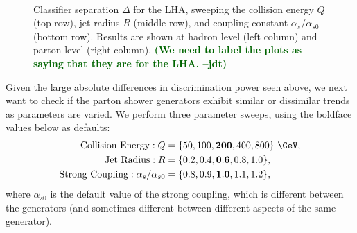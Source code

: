 \documentclass[11pt]{cernrep}
\newcommand{\jdt}[1]{\textbf{\textcolor{darkgreen}{(#1 --jdt)}}}
\begin{document}
\begin{figure}
$\qquad$
\caption{Classifier separation $\Delta$ for the LHA, sweeping the collision energy $Q$ (top row), jet radius $R$ (middle row), and coupling constant $\alpha_s/\alpha_{s0}$ (bottom row).  Results are shown at hadron level (left column) and parton level (right column).  \jdt{We need to label the plots as saying that they are for the LHA.}}
\label{quarkgluon_fig:ee_sweep}
\end{figure}

Given the large absolute differences in discrimination power seen above, we next want to check if the parton shower generators exhibit similar or dissimilar trends as parameters are varied.  We perform three parameter sweeps, using the boldface values below as defaults:
\begin{equation}
\begin{aligned}
\text{Collision Energy}: Q &= \{ 50, 100, \mathbf{200}, 400, 800\}~\GeV, \\
\text{Jet Radius}: R &= \{ 0.2, 0.4, \mathbf{0.6}, 0.8, 1.0\}, \\
\text{Strong Coupling}: \alpha_s / \alpha_{s0} &= \{0.8,0.9,\mathbf{1.0},1.1,1.2\}, \\
\end{aligned}
\end{equation}
where $\alpha_{s0}$ is the default value of the strong coupling, which is different between the generators (and sometimes different between different aspects of the same generator).
\end{document}

